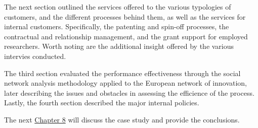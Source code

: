 The next section outlined the services offered to the various typologies of customers, and the different processes behind them, as well as the services for internal customers. Specifically, the patenting and spin-off processes, the contractual and relationship management, and the grant support for employed researchers. Worth noting are the additional insight offered by the various intervies conducted.

The third section evaluated the performance effectiveness through the social network analysis methodology applied to the European network of innovation, later describing the issues and obstacles in assessing the efficience of the process. Lastly, the fourth section described the major internal policies.

The next \hyperref[Chapter8]{Chapter 8} will discuss the case study and provide the conclusions. 